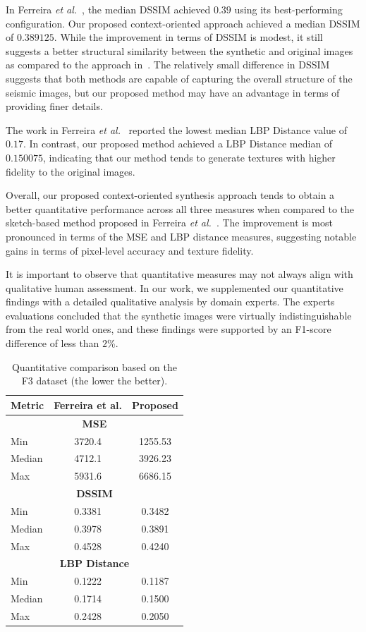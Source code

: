 \documentclass{ieeeaccess}
\begin{document}
In Ferreira \emph{et al.}~\cite{Ferreira2020}, the median DSSIM achieved $0.39$ using its best-performing configuration. Our proposed context-oriented approach achieved a median DSSIM of $0.389125$. While the improvement in terms of DSSIM is modest, it still suggests a better structural similarity between the synthetic and original images as compared to the approach in~\cite{Ferreira2020}. The relatively small difference in DSSIM suggests that both methods are capable of capturing the overall structure of the seismic images, but our proposed method may have an advantage in terms of providing finer details.

The work in Ferreira \emph{et al.}~\cite{Ferreira2020} reported the lowest median LBP Distance value of $0.17$. In contrast, our proposed method achieved a LBP Distance median of $0.150075$, indicating that our method tends to generate textures with higher fidelity to the original images.

Overall, our proposed context-oriented synthesis approach tends to obtain a better quantitative performance across all three measures when compared to the sketch-based method proposed in Ferreira \emph{et al.}~\cite{Ferreira2020}. The improvement is most pronounced in terms of the MSE and LBP distance measures, suggesting notable gains in terms of pixel-level accuracy and texture fidelity.

It is important to observe that quantitative measures may not always align with qualitative human assessment. In our work, we supplemented our quantitative findings with a detailed qualitative analysis by domain experts. The experts evaluations concluded that the synthetic images were virtually indistinguishable from the real world ones, and these findings were  supported by an F1-score difference of less than $2$\%.


\begin{table}[htbp]
    \centering
    \caption{Quantitative comparison based on the F3 dataset (the lower the better).}
    \label{tab:metricsSummary}
    \begin{tabular}{lcc}
        \toprule
        \textbf{Metric} & \textbf{Ferreira et al.} & \textbf{Proposed} \\
        \midrule
        \multicolumn{3}{c}{\textbf{MSE}} \\
        Min & 3720.4 & 1255.53 \\
        Median & 4712.1 & 3926.23 \\
        Max & 5931.6 & 6686.15 \\
        \midrule
        \multicolumn{3}{c}{\textbf{DSSIM}} \\
        Min & 0.3381 & 0.3482 \\
        Median & 0.3978 & 0.3891 \\
        Max & 0.4528 & 0.4240 \\
        \midrule
        \multicolumn{3}{c}{\textbf{LBP Distance}} \\
        Min & 0.1222 & 0.1187 \\
        Median & 0.1714 & 0.1500 \\
        Max & 0.2428 & 0.2050 \\
        \bottomrule
    \end{tabular}
\end{table}
\end{document}
